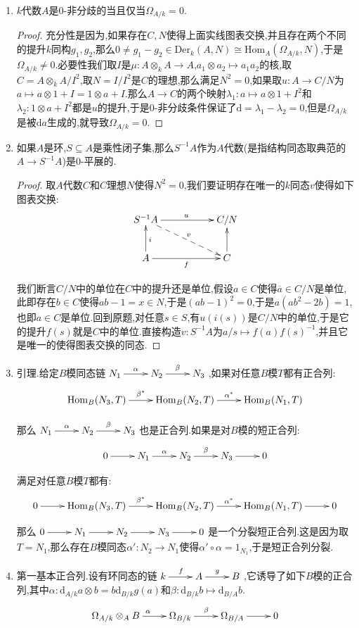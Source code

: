 \begin{enumerate}
	\item $k$代数$A$是0-非分歧的当且仅当$\Omega_{A/k}=0$.
	\begin{proof}
		
		充分性是因为,如果存在$C,N$使得上面实线图表交换,并且存在两个不同的提升$k$同构$g_1,g_2$,那么$0\not=g_1-g_2\in\mathrm{Der}_k(A,N)\cong\mathrm{Hom}_A(\Omega_{A/k},N)$,于是$\Omega_{A/k}\not=0$.必要性我们取$I$是$\mu:A\otimes_kA\to A$,$a_1\otimes a_2\mapsto a_1a_2$的核,取$C=A\otimes_kA/I^2$,取$N=I/I^2$是$C$的理想,那么满足$N^2=0$,如果取$u:A\to C/N$为$a\mapsto a\otimes1+I=1\otimes a+I$.那么$A\to C$的两个映射$\lambda_1:a\mapsto a\otimes1+I^2$和$\lambda_2:1\otimes a+I^2$都是$u$的提升,于是0-非分歧条件保证了$\mathrm{d}=\lambda_1-\lambda_2=0$,但是$\Omega_{A/k}$是被$\mathrm{d}a$生成的,就导致$\Omega_{A/k}=0$.
	\end{proof}
	\item 如果$A$是环,$S\subseteq A$是乘性闭子集,那么$S^{-1}A$作为$A$代数(是指结构同态取典范的$A\to S^{-1}A$)是0-平展的.
	\begin{proof}
		
		取$A$代数$C$和$C$理想$N$使得$N^2=0$,我们要证明存在唯一的$k$同态$v$使得如下图表交换:
		$$\xymatrix{S^{-1}A\ar[rr]^u\ar@{-->}[drr]^v&&C/N\\A\ar[rr]_f\ar[u]_i&&C\ar[u]}$$
		
		我们断言$C/N$中的单位在$C$中的提升还是单位,假设$a\in C$使得$\overline{a}\in C/N$是单位,此即存在$b\in C$使得$ab-1=x\in N$,于是$(ab-1)^2=0$,于是$a(ab^2-2b)=1$,也即$a\in C$是单位.回到原题,对任意$s\in S$,有$u(i(s))$是$C/N$中的单位,于是它的提升$f(s)$就是$C$中的单位.直接构造$v:S^{-1}A$为$a/s\mapsto f(a)f(s)^{-1}$,并且它是唯一的使得图表交换的同态.
	\end{proof}
	\item 引理.给定$B$模同态链$\xymatrix{N_1\ar[r]^{\alpha}&N_2\ar[r]^{\beta}&N_3}$,如果对任意$B$模$T$都有正合列:
	$$\xymatrix{\mathrm{Hom}_B(N_3,T)\ar[r]^{\beta^*}&\mathrm{Hom}_B(N_2,T)\ar[r]^{\alpha^*}&\mathrm{Hom}_B(N_1,T)}$$
	
	那么$\xymatrix{N_1\ar[r]^{\alpha}&N_2\ar[r]^{\beta}&N_3}$也是正合列.如果是对$B$模的短正合列:
	$$\xymatrix{0\ar[r]&N_1\ar[r]^{\alpha}&N_2\ar[r]^{\beta}&N_3\ar[r]&0}$$
	
	满足对任意$B$模$T$都有:
	$$\xymatrix{0\ar[r]&\mathrm{Hom}_B(N_3,T)\ar[r]^{\beta^*}&\mathrm{Hom}_B(N_2,T)\ar[r]^{\alpha^*}&\mathrm{Hom}_B(N_1,T)\ar[r]&0}$$
	
	那么$\xymatrix{0\ar[r]&N_1\ar[r]&N_2\ar[r]&N_3\ar[r]&0}$是一个分裂短正合列.这是因为取$T=N_1$,那么存在$B$模同态$\alpha':N_2\to N_1$使得$\alpha'\circ\alpha=1_{N_1}$,于是短正合列分裂.
	\item 第一基本正合列.设有环同态的链$\xymatrix{k\ar[r]^f&A\ar[r]^g&B}$,它诱导了如下$B$模的正合列,其中$\alpha:\mathrm{d}_{A/k}a\otimes b=b\mathrm{d}_{B/k}g(a)$和$\beta:\mathrm{d}_{B/k}b\mapsto\mathrm{d}_{B/A}b$.
	$$\xymatrix{\Omega_{A/k}\otimes_AB\ar[r]^{\alpha}&\Omega_{B/k}\ar[r]^{\beta}&\Omega_{B/A}\ar[r]&0}$$
	

\end{enumerate}
